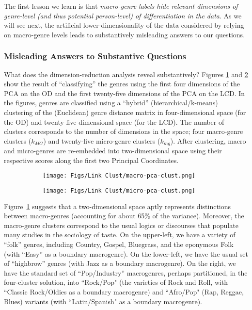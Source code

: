 The first lesson we learn is that {\em macro-genre labels hide relevant dimensions of genre-level (and thus potential person-level) of differentiation in the data}. As we will see next, the artificial lower-dimensionality of the data considered by relying on macro-genre levels leads to substantively misleading answers to our questions.  

\subsubsection{Misleading Answers to Substantive Questions}
 What does the dimension-reduction analysis reveal substantively? Figures \ref{fig:macro-pca} and \ref{fig:micro-pca} show the result of ``classifying'' the genres using the first four dimensions of the PCA on the OD and the first twenty-five dimensions of the PCA on the LCD. In the figures, genres are classified using a ``hybrid'' (hierarchical/k-means) clustering of the (Euclidean) genre distance matrix in four-dimensional space (for the OD) and twenty-five-dimensional space (for the LCD). The number of clusters corresponds to the number of dimensions in the space; four macro-genre clusters ($k_{MG}$) and twenty-five micro-genre clusters ($k_{mg}$). After clustering, macro and micro-genres are re-embedded into two-dimensional space using their respective scores along the first two Principal Coordinates. 
 
\begin{figure}[ht!]
     \begin{subfigure}[b]{1.0\textwidth}
        \centering
        \texttt{[image: Figs/Link Clust/macro-pca-clust.png]}
        \caption{}
        \label{fig:macro-pca}
    \end{subfigure} 
     \begin{subfigure}[b]{1.0\textwidth}
        \centering
        \texttt{[image: Figs/Link Clust/micro-pca-clust.png]}
        \caption{}
        \label{fig:micro-pca}
    \end{subfigure} 
    \caption{}
    \label{fig:macro-v-micro-pca}
 \end{figure}
 
 Figure~\ref{fig:macro-pca} suggests that a two-dimensional space aptly represents distinctions between macro-genres (accounting for about 65\% of the variance). Moreover, the macro-genre clusters correspond to the usual logics or discourses that populate many studies in the sociology of taste. On the upper-left, we have a variety of ``folk'' genres, including Country, Gospel, Bluegrass, and the eponymous Folk (with ``Easy'' as a boundary macrogenre). On the lower-left, we have the usual set of ``highbrow'' genres (with Jazz as a boundary macrogenre). On the right, we have the standard set of ``Pop/Industry'' macrogenres, perhaps partitioned, in the four-cluster solution, into ``Rock/Pop" (the varieties of Rock and Roll, with ``Classic Rock/Oldies as a boundary macrogenre) and ``Afro/Pop" (Rap, Reggae, Blues) variants (with ``Latin/Spanish" as a boundary macrogenre). 
 
